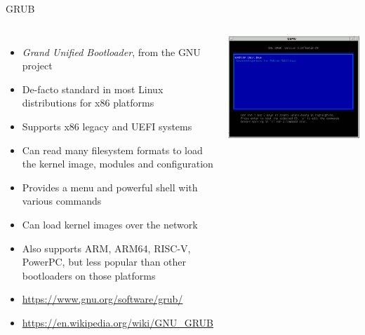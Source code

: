 \begin{frame}{GRUB}
  \begin{columns}
    \begin{itemize}
    \item {\em Grand Unified Bootloader}, from the GNU project
    \item De-facto standard in most Linux distributions for x86
      platforms
    \item Supports x86 legacy and UEFI systems
    \item Can read many filesystem formats to load the kernel image,
      modules and configuration
    \item Provides a menu and powerful shell with various commands
    \item Can load kernel images over the network
    \item Also supports ARM, ARM64, RISC-V, PowerPC, but less popular
      than other bootloaders on those platforms
    \item \url{https://www.gnu.org/software/grub/}
    \item \url{https://en.wikipedia.org/wiki/GNU_GRUB}
    \end{itemize}
    \includegraphics[width=\textwidth]{slides/sysdev-bootloaders-sequence/grub2.png}
  \end{columns}
\end{frame}

